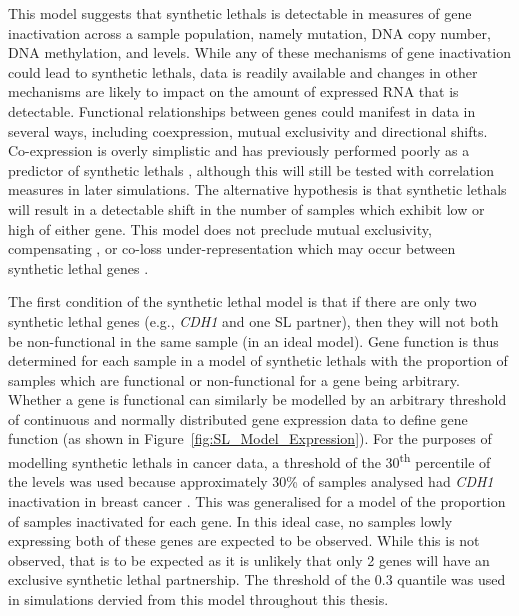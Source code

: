 This model suggests that \glspl{synthetic lethal} is detectable in measures of gene inactivation across a sample population, namely \gls{mutation}, \acrshort{DNA} \gls{copy number}, \acrshort{DNA} \gls{methylation}, and  levels. While any of these mechanisms of gene inactivation could lead to \glspl{synthetic lethal},  data is readily available and changes in other mechanisms are likely to impact on the amount of expressed \acrshort{RNA} that is detectable. Functional relationships between genes could manifest in  data in several ways, including coexpression, mutual exclusivity and directional shifts. Co-expression is overly simplistic \citep{Lu2015} and has previously performed poorly as a predictor of \glspl{synthetic lethal} \citep{Jerby2014}, although this will still be tested with correlation measures in later simulations. The alternative hypothesis is that \glspl{synthetic lethal} will result in a detectable shift in the number of samples which exhibit low or high  of either gene. This model does not preclude mutual exclusivity, compensating , or co-loss under-representation which may occur between \gls{synthetic lethal} genes \citep{Wappett2016, Lu2015}. 

The first condition of the \gls{synthetic lethal} model is that if there are only two \gls{synthetic lethal} genes (e.g., \textit{CDH1} and one SL partner), then they will not both be non-functional in the same sample (in an ideal model). Gene function is thus determined for each sample in a model of \glspl{synthetic lethal} with the proportion of samples which are functional or non-functional for a gene being arbitrary. Whether a gene is functional can similarly be modelled by an arbitrary threshold of continuous and normally distributed \gls{gene expression} data to define gene function (as shown in Figure~\ref{fig:SL_Model_Expression}). For the purposes of modelling \glspl{synthetic lethal} in cancer  data, a threshold of the 30\textsuperscript{th} percentile of the  levels was used because approximately 30\% of samples analysed had \textit{CDH1} inactivation in breast cancer \citep{TCGA2012}. This was generalised for a model of the proportion of samples inactivated for each gene. In this ideal case, no samples lowly expressing both of these genes are expected to be observed. While this is not observed, that is to be expected as it is unlikely that only 2 genes will have an exclusive \gls{synthetic lethal} partnership. The threshold of the 0.3 quantile was used in simulations dervied from this model throughout this thesis.

